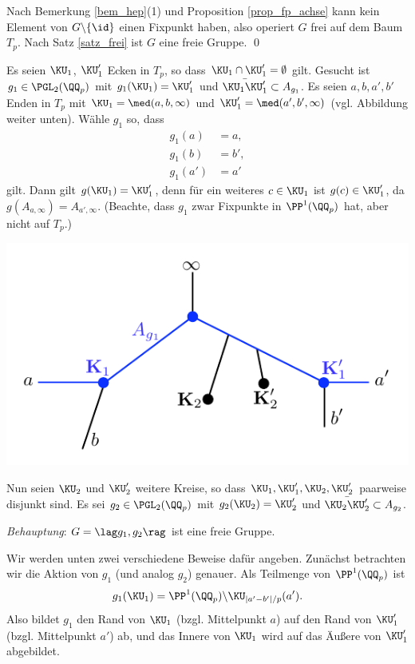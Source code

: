 \bew Nach
Bemerkung \ref{bem_hep}(1) und Proposition \ref{prop_fp_achse}
kann kein Element von $G\backslash\{\id\}$ einen Fixpunkt haben,
also operiert $G$ frei auf dem Baum $T_p$.
Nach Satz \ref{satz_frei} ist $G$ eine freie Gruppe.
\qed

\BSP Es seien $\KU_1$, $\KU_1'$ Ecken in $T_p$, so dass
$\KU_1\cap\KU_1'=\emptyset$ gilt.
Gesucht ist $g_1\in\PGL_2(\QQ_p)$ mit $g_1(\KU_1)=\KU_1'$ und
$\bar{\KU_1 \KU_1'}\subset A_{g_1}$.
Es seien $a,b,a',b'$ Enden in $T_p$ mit
$\KU_1=\med(a,b,\infty)$ und $\KU_1'=\med(a',b',\infty)$
(vgl. Abbildung weiter unten).
Wähle $g_1$ so, dass
\begin{align*}
g_1(a) &= a,\\
g_1(b) &= b',\\
g_1(a') &= a'
\end{align*}
gilt. Dann gilt $g(\KU_1)=\KU_1'$, denn für ein weiteres $c\in\KU_1$
ist $g(c)\in\KU_1'$, da $g(A_{a,\infty})=A_{a',\infty}$.
(Beachte, dass $g_1$ zwar
Fixpunkte in $\PP^1(\QQ_p)$ hat, aber nicht auf $T_p$.)
\begin{center}
	\includegraphics{grugraImages/ihara1}
\end{center}
Nun seien $\KU_2$ und $\KU_2'$ weitere Kreise, so dass
$\KU_1,\KU_1',\KU_2,\KU_2'$ paarweise disjunkt sind.
Es sei $g_2\in\PGL_2(\QQ_p)$ mit $g_2(\KU_2)=\KU_2'$ und
$\bar{\KU_2 \KU_2'}\subset A_{g_2}$.

\textsl{Behauptung}: $G=\lag g_1, g_2 \rag$ ist eine freie Gruppe.

Wir werden unten zwei verschiedene Beweise dafür angeben.
Zunächst betrachten wir die Aktion von $g_1$ (und analog $g_2$)
genauer. Als Teilmenge von $\PP^1(\QQ_p)$ ist
\[
g_1(\KU_1) = \PP^1(\QQ_p) \backslash \KU_{|a'-b'|/p}(a').
\]
Also bildet $g_1$ den Rand von $\KU_1$  (bzgl. Mittelpunkt $a$) auf
den Rand von $\KU_1'$ (bzgl. Mittelpunkt $a'$) ab, und das Innere
von $\KU_1$ wird auf das Äußere von $\KU_1'$ abgebildet.

